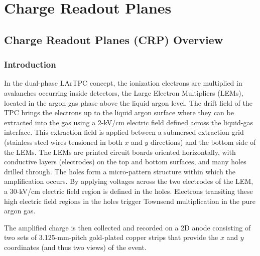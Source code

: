 \chapter{Charge Readout Planes}
\label{ch:fddp-CRP}

\section{Charge Readout Planes (CRP) Overview}
\label{sec:fddp-crp-ov}


\subsection{Introduction}
\label{sec:fddp-crp-intro}

In the dual-phase LArTPC concept, the ionization electrons are multiplied in avalanches 
occurring inside detectors, the Large Electron Multipliers (LEMs), located in the argon gas 
phase above the liquid argon level. The drift field of the TPC brings the electrons up to the liquid argon surface where they can  be   
extracted into the gas using a 2-kV/cm electric field defined across the liquid-gas interface.
This extraction field is applied between a submersed extraction
grid (stainless steel wires tensioned in both $x$ and $y$
directions) and the bottom side of the LEMs.
The LEMs are printed circuit boards oriented horizontally, with
conductive layers (electrodes) on the top and bottom surfaces, and many holes drilled
through. The holes form a micro-pattern structure within which the amplification occurs.  
By applying voltages across the two
electrodes of the LEM, a 30-kV/cm electric field region is defined in the holes\cite{Bondar:2008yw}.
Electrons transiting these high electric field regions in the holes trigger Townsend multiplication in the
pure argon gas.


The amplified charge is then collected and recorded on a 2D anode
consisting of two sets of 3.125-mm-pitch gold-plated copper strips that provide the $x$
and $y$ coordinates (and thus two views) of the event.

